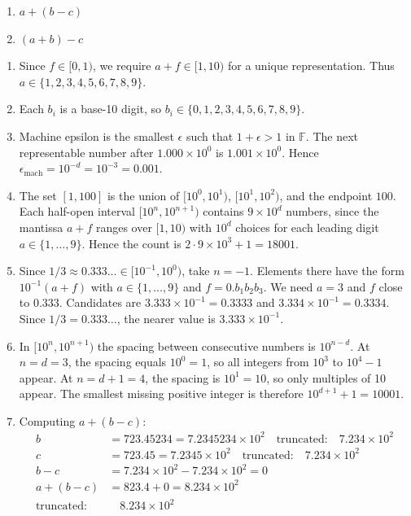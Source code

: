 \documentclass[reqno]{exam}
\begin{document}
\begin{enumerate}
\begin{enumerate}[resume]
  \item $a + (b - c)$
  \item $(a + b) - c$
\end{enumerate}

\begin{solution}
\begin{enumerate}
  \item Since $f \in [0,1)$, we require $a + f \in [1, 10)$ for a unique representation. Thus $a \in \{1, 2, 3, 4, 5, 6, 7, 8, 9\}$.
  
  \item Each $b_i$ is a base-10 digit, so $b_i \in \{0, 1, 2, 3, 4, 5, 6, 7, 8, 9\}$.
  
  \item Machine epsilon is the smallest $\epsilon$ such that $1 + \epsilon > 1$ in $\mathbb{F}$. The next representable number after $1.000 \times 10^0$ is $1.001 \times 10^0$. Hence $\epsilon_{\text{mach}} = 10^{-d} = 10^{-3} = 0.001$.
  
  \item The set $[1, 100]$ is the union of $[10^0, 10^1)$, $[10^1, 10^2)$, and the endpoint $100$. Each half-open interval $[10^n, 10^{n+1})$ contains $9 \times 10^d$ numbers, since the mantissa $a + f$ ranges over $[1, 10)$ with $10^d$ choices for each leading digit $a \in \{1, \ldots, 9\}$. Hence the count is $2 \cdot 9 \times 10^3 + 1 = 18001$.
  
  \item Since $1/3 \approx 0.333\ldots \in [10^{-1}, 10^0)$, take $n = -1$. Elements there have the form $10^{-1}(a + f)$ with $a \in \{1, \ldots, 9\}$ and $f = 0.b_1 b_2 b_3$. We need $a = 3$ and $f$ close to $0.333$. Candidates are $3.333 \times 10^{-1} = 0.3333$ and $3.334 \times 10^{-1} = 0.3334$. Since $1/3 = 0.333\ldots$, the nearer value is $3.333 \times 10^{-1}$.
  
  \item In $[10^n, 10^{n+1})$ the spacing between consecutive numbers is $10^{n-d}$. At $n = d = 3$, the spacing equals $10^0 = 1$, so all integers from $10^3$ to $10^4 - 1$ appear. At $n = d + 1 = 4$, the spacing is $10^1 = 10$, so only multiples of 10 appear. The smallest missing positive integer is therefore $10^{d+1} + 1 = 10001$.
  
\item Computing $a + (b - c)$:
  \begin{align*}
    b &= 723.45234 = 7.2345234 \times 10^{2} \quad \text{truncated:} \quad 7.234 \times 10^{2} \\
    c &= 723.45 = 7.2345 \times 10^{2} \quad \text{truncated:} \quad 7.234 \times 10^{2} \\
    b - c &= 7.234 \times 10^{2} - 7.234 \times 10^{2} = 0 \\
    a + (b - c) &= 823.4 + 0 = 8.234 \times 10^{2} \\
    \text{truncated:} & \quad \boxed{8.234 \times 10^{2}}
  \end{align*}
  

\end{enumerate}
\end{solution}
\end{enumerate}
\end{document}
